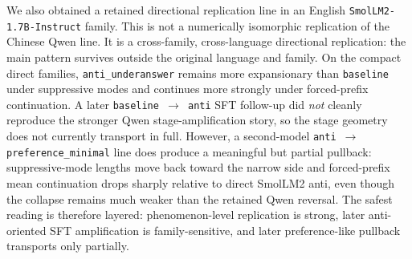 \documentclass[11pt]{article}
\begin{document}
We also obtained a retained directional replication line in an English \texttt{SmolLM2-1.7B-Instruct} family. This is not a numerically isomorphic replication of the Chinese Qwen line. It is a cross-family, cross-language directional replication: the main pattern survives outside the original language and family. On the compact direct families, \texttt{anti\_underanswer} remains more expansionary than \texttt{baseline} under suppressive modes and continues more strongly under forced-prefix continuation. A later \texttt{baseline $\rightarrow$ anti} SFT follow-up did \emph{not} cleanly reproduce the stronger Qwen stage-amplification story, so the stage geometry does not currently transport in full. However, a second-model \texttt{anti $\rightarrow$ preference\_minimal} line does produce a meaningful but partial pullback: suppressive-mode lengths move back toward the narrow side and forced-prefix mean continuation drops sharply relative to direct SmolLM2 anti, even though the collapse remains much weaker than the retained Qwen reversal. The safest reading is therefore layered: phenomenon-level replication is strong, later anti-oriented SFT amplification is family-sensitive, and later preference-like pullback transports only partially.

\begin{table}[t]
\centering
\small
\caption{Second-family transport summary on \texttt{SmolLM2-1.7B-Instruct}. The direct-family rows establish phenomenon-level replication; the two follow-up rows show that later-stage transport is asymmetric and partial.}
\label{tab:smollm2-transport}
\end{table}
\end{document}
